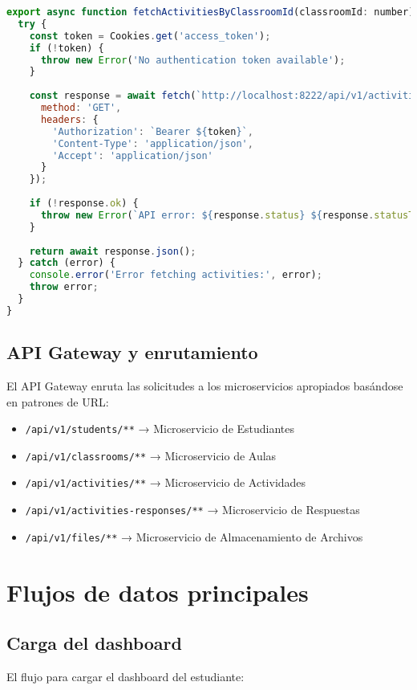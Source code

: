 \documentclass[12pt,a4paper]{report}
\begin{document}
\begin{lstlisting}[language=JavaScript, caption=Ejemplo de función API en el frontend]
export async function fetchActivitiesByClassroomId(classroomId: number) {
  try {
    const token = Cookies.get('access_token');
    if (!token) {
      throw new Error('No authentication token available');
    }
    
    const response = await fetch(`http://localhost:8222/api/v1/activities/classrooms/${classroomId}`, {
      method: 'GET',
      headers: {
        'Authorization': `Bearer ${token}`,
        'Content-Type': 'application/json',
        'Accept': 'application/json'
      }
    });
    
    if (!response.ok) {
      throw new Error(`API error: ${response.status} ${response.statusText}`);
    }
    
    return await response.json();
  } catch (error) {
    console.error('Error fetching activities:', error);
    throw error;
  }
}
\end{lstlisting}

\subsection{API Gateway y enrutamiento}
El API Gateway enruta las solicitudes a los microservicios apropiados basándose en patrones de URL:

\begin{itemize}
    \item \texttt{/api/v1/students/**} → Microservicio de Estudiantes
    \item \texttt{/api/v1/classrooms/**} → Microservicio de Aulas
    \item \texttt{/api/v1/activities/**} → Microservicio de Actividades
    \item \texttt{/api/v1/activities-responses/**} → Microservicio de Respuestas
    \item \texttt{/api/v1/files/**} → Microservicio de Almacenamiento de Archivos
\end{itemize}

\section{Flujos de datos principales}
\subsection{Carga del dashboard}
El flujo para cargar el dashboard del estudiante:
\end{document}
